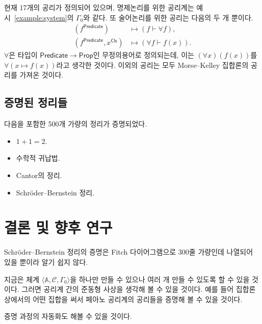 \documentclass[10pt,twocolumn]{article}
\theoremstyle{definition}
\newcommand{\Prop}{\mathsf{Prop}}
\newcommand{\Cls}{\mathsf{Cls}}
\newcommand{\Predicate}{\mathsf{Predicate}}
\begin{document}
현재 17개의 공리가 정의되어 있으며, 명제논리를 위한 공리계는 예시~\ref{example:system}의 $\Gamma_0$와 같다. 또 술어논리를 위한 공리는 다음의 두 개 뿐이다.
\begin{align*}
	(f^\Predicate)&\mapsto (f\vdash\forall f), \\
	(f^\Predicate, x^\Cls)&\mapsto (\forall f\vdash f(x)).
\end{align*}
$\forall$은 타입이 $\Predicate\to\Prop$인 무정의용어로 정의되는데, 이는 $(\forall x)(f(x))$를 $\forall(x\mapsto f(x))$라고 생각한 것이다. 이외의 공리는 모두 Morse--Kelley 집합론의 공리를 가져온 것이다.

\subsection{증명된 정리들}

다음을 포함한 500개 가량의 정리가 증명되었다.

\begin{itemize}
	\item $1+1=2$.
	\item 수학적 귀납법.
	\item Cantor의 정리.
	\item Schr\"oder--Bernstein 정리.
\end{itemize}

\section{결론 및 향후 연구}

Schr\"oder--Bernstein 정리의 증명은 Fitch 다이어그램으로 300줄 가량인데 나열되어 있을 뿐이라 알기 쉽지 않다.

지금은 체계 $\langle\mathbb A, \mathcal C, \Gamma_0\rangle$을 하나만 만들 수 있으나 여러 개 만들 수 있도록 할 수 있을 것이다. 그러면 공리계 간의 준동형 사상을 생각해 볼 수 있을 것이다. 예를 들어 집합론 상에서의 어떤 집합을 써서 페아노 공리계의 공리들을 증명해 볼 수 있을 것이다.

증명 과정의 자동화도 해볼 수 있을 것이다.


\end{document}

